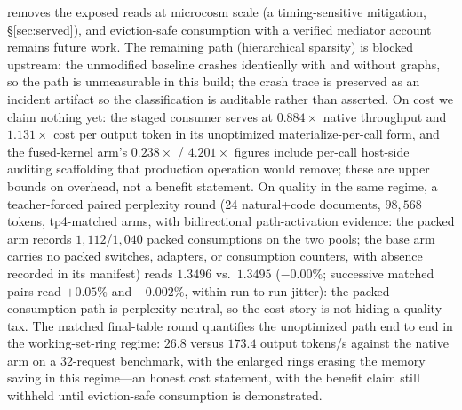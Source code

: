 \documentclass[11pt]{article}
\begin{document}
removes the exposed reads at microcosm scale (a timing-sensitive
mitigation, \S\ref{sec:served}), and eviction-safe consumption with a
verified mediator account remains future work. The remaining path (hierarchical sparsity) is blocked
upstream: the unmodified baseline crashes identically with and without
graphs, so the path is unmeasurable in this build; the crash trace is
preserved as an incident artifact so the classification is auditable
rather than asserted. On cost we claim
nothing yet: the staged consumer serves at $0.884\times$ native throughput
and $1.131\times$ cost per output token in its unoptimized
materialize-per-call form, and the fused-kernel arm's $0.238\times$ /
$4.201\times$ figures include per-call host-side auditing scaffolding that
production operation would remove; these are upper bounds on overhead, not
a benefit statement. On quality in the same regime, a
teacher-forced paired perplexity round (24 natural+code documents,
$98{,}568$ tokens, tp4-matched arms, with bidirectional path-activation
evidence: the packed arm records $1{,}112$/$1{,}040$ packed
consumptions on the two pools; the base arm carries no packed switches,
adapters, or consumption counters, with absence recorded in its
manifest) reads $1.3496$ vs.\ $1.3495$ ($-0.00\%$; successive matched
pairs read $+0.05\%$ and $-0.002\%$, within run-to-run jitter): the
packed consumption path is perplexity-neutral, so the cost story is
not hiding a quality tax. The matched final-table round quantifies the
unoptimized path end to end in the working-set-ring regime: $26.8$
versus $173.4$ output tokens/s against the native arm on a 32-request
benchmark, with the enlarged rings erasing the memory saving in this
regime---an honest cost statement, with the benefit claim still
withheld until eviction-safe consumption is demonstrated.
\end{document}
